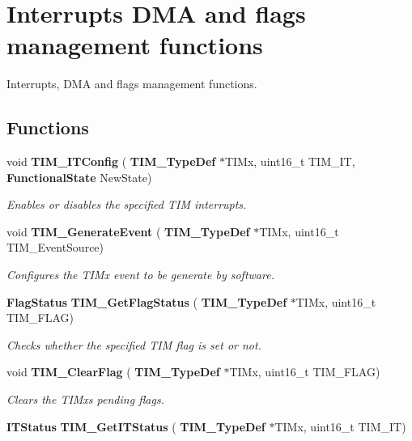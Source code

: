 \section{Interrupts D\+MA and flags management functions}
\label{group__TIM__Group5}


Interrupts, D\+MA and flags management functions.  


\subsection*{Functions}
\begin{DoxyCompactItemize}
\item 
void \textbf{ T\+I\+M\+\_\+\+I\+T\+Config} (\textbf{ T\+I\+M\+\_\+\+Type\+Def} $\ast$T\+I\+Mx, uint16\+\_\+t T\+I\+M\+\_\+\+IT, \textbf{ Functional\+State} New\+State)
\begin{DoxyCompactList}\small\item\em Enables or disables the specified T\+IM interrupts. \end{DoxyCompactList}\item 
void \textbf{ T\+I\+M\+\_\+\+Generate\+Event} (\textbf{ T\+I\+M\+\_\+\+Type\+Def} $\ast$T\+I\+Mx, uint16\+\_\+t T\+I\+M\+\_\+\+Event\+Source)
\begin{DoxyCompactList}\small\item\em Configures the T\+I\+Mx event to be generate by software. \end{DoxyCompactList}\item 
\textbf{ Flag\+Status} \textbf{ T\+I\+M\+\_\+\+Get\+Flag\+Status} (\textbf{ T\+I\+M\+\_\+\+Type\+Def} $\ast$T\+I\+Mx, uint16\+\_\+t T\+I\+M\+\_\+\+F\+L\+AG)
\begin{DoxyCompactList}\small\item\em Checks whether the specified T\+IM flag is set or not. \end{DoxyCompactList}\item 
void \textbf{ T\+I\+M\+\_\+\+Clear\+Flag} (\textbf{ T\+I\+M\+\_\+\+Type\+Def} $\ast$T\+I\+Mx, uint16\+\_\+t T\+I\+M\+\_\+\+F\+L\+AG)
\begin{DoxyCompactList}\small\item\em Clears the T\+I\+Mx\textquotesingle{}s pending flags. \end{DoxyCompactList}\item 
\textbf{ I\+T\+Status} \textbf{ T\+I\+M\+\_\+\+Get\+I\+T\+Status} (\textbf{ T\+I\+M\+\_\+\+Type\+Def} $\ast$T\+I\+Mx, uint16\+\_\+t T\+I\+M\+\_\+\+IT)

\end{DoxyCompactItemize}

